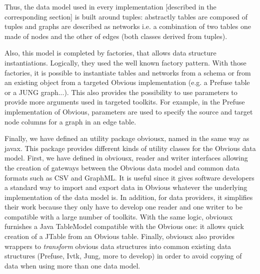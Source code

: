 Thus, the data model used in every implementation [described in the
  corresponding section] is built around tuples: abstractly tables are
composed of tuples and graphs are described as networks i.e. a
combination of two tables one made of nodes and the other of edges
(both classes derived from tuples).

Also, this model is completed by factories, that allows data structure
instantiations. Logically, they used the well known factory
pattern. With those factories, it is possible to instantiate tables
and networks from a schema or from an existing object from a targeted
Obvious implementation (e.g. a Prefuse table or a JUNG graph...). This also
provides the possibility to use parameters to provide more arguments
used in targeted toolkits. For example, in the Prefuse implementation
of Obvious, parameters are used to specify the source and target node columns
for a graph in an edge table.

Finally, we have defined an utility package obviousx, named in the
same way as javax. This package provides different kinds of utility
classes for the Obvious data model. First, we have defined in
obviousx, reader and writer interfaces allowing the creation of gateways
between the Obvious data model and common data formats such as CSV and
GraphML. It is useful since it gives software developers a standard
way to import and export data in Obvious whatever the underlying
implementation of the data model is. In addition, for data providers,
it simplifies their work because they only have to develop one reader
and one writer to be compatible with a large number of toolkits. With
the same logic, obviousx furnishes a Java TableModel compatible with
the Obvious one: it allows quick creation of a JTable from an Obvious
table. Finally, obviousx also provides wrappers to \emph{transform}
obvious data structures into common existing data structures (Prefuse,
Ivtk, Jung, more to develop) in order to avoid copying of data when using more than
one data model.
 
